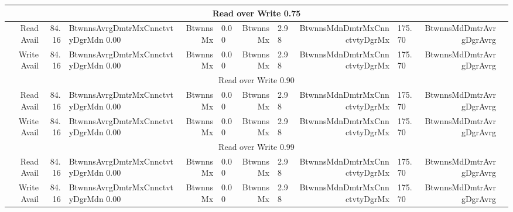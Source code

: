\begin{tabular}{r | r l | r l | r l | r l | r l}
\multicolumn{11}{c}{Read over Write 0.75} \\ \hline
Read Avail & 84.16 & BtwnnsAvrgDmtrMxCnnctvtyDgrMdn  0.00 & BtwnnsMx &                   0.00 & BtwnnsMx &          2.98 & BtwnnsMdnDmtrMxCnnctvtyDgrMx &   175.70 & BtwnnsMdDmtrAvrgDgrAvrg  \\
Write Avail & 84.16 & BtwnnsAvrgDmtrMxCnnctvtyDgrMdn  0.00 & BtwnnsMx &                   0.00 & BtwnnsMx &          2.98 & BtwnnsMdnDmtrMxCnnctvtyDgrMx &   175.70 & BtwnnsMdDmtrAvrgDgrAvrg  \\ \hline
\multicolumn{11}{c}{Read over Write 0.90}  \\ \hline
Read Avail & 84.16 & BtwnnsAvrgDmtrMxCnnctvtyDgrMdn  0.00 & BtwnnsMx &                   0.00 & BtwnnsMx &          2.98 & BtwnnsMdnDmtrMxCnnctvtyDgrMx &   175.70 & BtwnnsMdDmtrAvrgDgrAvrg  \\
Write Avail & 84.16 & BtwnnsAvrgDmtrMxCnnctvtyDgrMdn  0.00 & BtwnnsMx &                   0.00 & BtwnnsMx &          2.98 & BtwnnsMdnDmtrMxCnnctvtyDgrMx &   175.70 & BtwnnsMdDmtrAvrgDgrAvrg  \\ \hline
\multicolumn{11}{c}{Read over Write 0.99} \\ \hline
Read Avail & 84.16 & BtwnnsAvrgDmtrMxCnnctvtyDgrMdn  0.00 & BtwnnsMx &                   0.00 & BtwnnsMx &          2.98 & BtwnnsMdnDmtrMxCnnctvtyDgrMx &   175.70 & BtwnnsMdDmtrAvrgDgrAvrg  \\
Write Avail & 84.16 & BtwnnsAvrgDmtrMxCnnctvtyDgrMdn  0.00 & BtwnnsMx &                   0.00 & BtwnnsMx &          2.98 & BtwnnsMdnDmtrMxCnnctvtyDgrMx &   175.70 & BtwnnsMdDmtrAvrgDgrAvrg  \\ \hline



\end{tabular}
